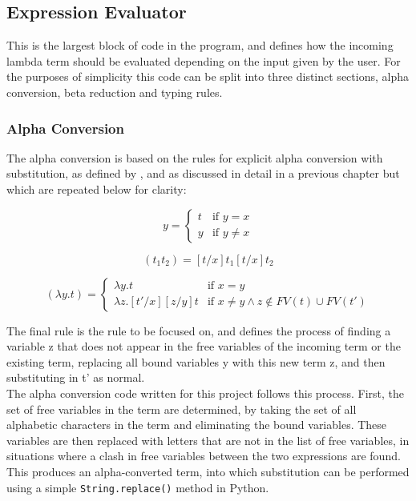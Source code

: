 \documentclass[a4paper,11pt]{report}
\begin{document}
\subsection{Expression Evaluator}
This is the largest block of code in the program, and defines how the incoming lambda term should be evaluated depending on the input given by the user. For the purposes of simplicity this code can be split into three distinct sections, alpha conversion, beta reduction and typing rules.

\subsubsection{Alpha Conversion}
The alpha conversion is based on the rules for explicit alpha conversion with substitution, as defined by \cite{Acar2008}, and as discussed in detail in a previous chapter but which are repeated below for clarity:

\begin{equation*}
[t/x]y=\begin{cases}
t & \text{if $y=x$}\\
y & \text{if $y\ne x$}
\end{cases}
\end{equation*}

\begin{equation*}
[t/x](t_1t_2)=[t/x]t_1[t/x]t_2
\end{equation*}

\begin{equation*}
[t'/x](\lambda y.t)=\begin{cases}
\lambda y.t & \text{if $x=y$}\\
\lambda z.[t'/x][z/y]t & \text{if $x\ne y \land z\notin FV(t) \cup FV(t')$}
\end{cases}
\end{equation*}

The final rule is the rule to be focused on, and defines the process of finding a variable z that does not appear in the free variables of the incoming term or the existing term, replacing all bound variables y with this new term z, and then substituting in t’ as normal.\\

The alpha conversion code written for this project follows this process. First, the set of free variables in the term are determined, by taking the set of all alphabetic characters in the term and eliminating the bound variables. These variables are then replaced with letters that are not in the list of free variables, in situations where a clash in free variables between the two expressions are found. This produces an alpha-converted term, into which substitution can be performed using a simple \texttt{String.replace()} method in Python.
\end{document}
